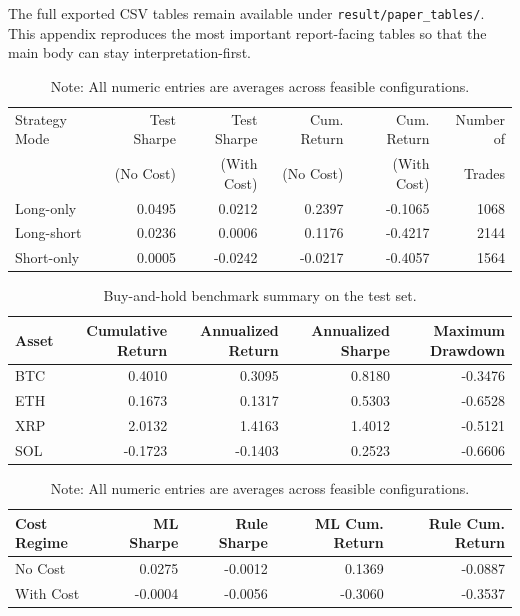 \documentclass[12pt]{article}
\begin{document}
The full exported CSV tables remain available under \texttt{result/paper\_tables/}. This appendix reproduces the most important report-facing tables so that the main body can stay interpretation-first.

\begin{table}[H]
\centering
\caption{Average feasible test outcomes across strategy modes.}
\label{tab:appendix_overall_performance}
\begingroup
\singlespacing
\begin{tabular}{lrrrrr}
\toprule
Strategy Mode & Test Sharpe & Test Sharpe & Cum. Return & Cum. Return & Number of \\
 & (No Cost) & (With Cost) & (No Cost) & (With Cost) & Trades \\
\midrule
Long-only & 0.0495 & 0.0212 & 0.2397 & -0.1065 & 1068 \\
Long-short & 0.0236 & 0.0006 & 0.1176 & -0.4217 & 2144 \\
Short-only & 0.0005 & -0.0242 & -0.0217 & -0.4057 & 1564 \\
\bottomrule
\end{tabular}
\endgroup
\caption*{\footnotesize Note: All numeric entries are averages across feasible configurations.}
\end{table}

\begin{table}[H]
\centering
\caption{Buy-and-hold benchmark summary on the test set.}
\label{tab:appendix_buyhold}
\begingroup
\singlespacing
\begin{tabular}{lrrrr}
\toprule
Asset & Cumulative Return & Annualized Return & Annualized Sharpe & Maximum Drawdown \\
\midrule
BTC & 0.4010 & 0.3095 & 0.8180 & -0.3476 \\
ETH & 0.1673 & 0.1317 & 0.5303 & -0.6528 \\
XRP & 2.0132 & 1.4163 & 1.4012 & -0.5121 \\
SOL & -0.1723 & -0.1403 & 0.2523 & -0.6606 \\
\bottomrule
\end{tabular}
\endgroup
\end{table}

\begin{table}[H]
\centering
\caption{Average feasible test outcomes by model family.}
\label{tab:appendix_model_family}
\begingroup
\singlespacing
\begin{tabular}{lrrrr}
\toprule
Cost Regime & ML Sharpe & Rule Sharpe & ML Cum. Return & Rule Cum. Return \\
\midrule
No Cost & 0.0275 & -0.0012 & 0.1369 & -0.0887 \\
With Cost & -0.0004 & -0.0056 & -0.3060 & -0.3537 \\
\bottomrule
\end{tabular}
\endgroup
\caption*{\footnotesize Note: All numeric entries are averages across feasible configurations.}
\end{table}
\end{document}
